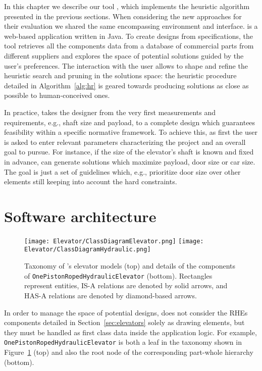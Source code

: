 In this chapter we describe our tool \liftcreate{}, which implements
the heuristic algorithm presented in the previous sections.
When considering the new approaches for their evaluation we shared the 
same encompassing environment and interface.
\liftcreate{} is a web-based application written in Java. To create
designs from specifications, the tool retrieves all the components 
data from a database of commercial parts from different suppliers
and explores the space of potential solutions guided by the user's
preferences. The interaction with the user allows to shape and refine
the heuristic search and pruning in the solutions space: the heuristic
procedure detailed in Algorithm~\ref{alg:hr} is geared towards
producing solutions as close as possible to human-conceived ones.

In practice, \liftcreate{} takes the designer from the very first
measurements and requirements, e.g., shaft size and payload, to a 
complete design which guarantees feasibility within a specific normative
framework. To achieve this, as first the user is asked to enter relevant
parameters characterizing the project and an overall goal to pursue.
For instance, if the size of the elevator's shaft is known and fixed
in advance, \liftcreate{} can generate solutions which maximize payload,
door size or car size. The goal is just a set of guidelines which, e.g.,
prioritize door size over other elements still keeping into account
the hard constraints.

\section{Software architecture}
\label{sec:arch-liftcreate}

\begin{figure}[t]
	\caption{\label{fig:elev_onto} Taxonomy of \liftcreate's elevator
		models (top) and details of the components of
		\texttt{OnePistonRopedHydraulicElevator} (bottom). Rectangles
		represent entities, IS-A relations are denoted by solid arrows, 
		and HAS-A relations are denoted by diamond-based arrows.} 
	\centering
	\texttt{[image: Elevator/ClassDiagramElevator.png]}
	\texttt{[image: Elevator/ClassDiagramHydraulic.png]}
\end{figure}

In order to manage the space of potential designs, \liftcreate{} does
not consider the RHEs components detailed in Section~\ref{sec:elevators}
solely as drawing elements, but they must be handled as first class data
inside the application logic. For example, \texttt{OnePistonRopedHydraulicElevator}
is both a leaf in the taxonomy shown in Figure~\ref{fig:elev_onto} (top)
and also the root node of the corresponding part-whole hierarchy (bottom).

